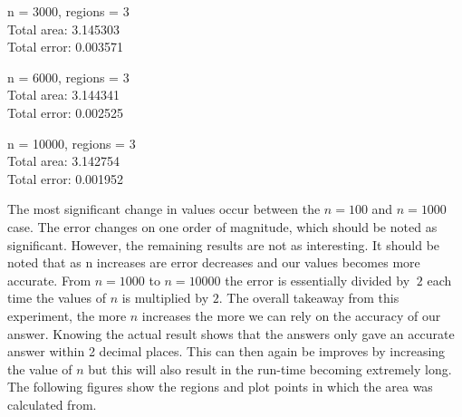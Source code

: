 \documentclass[12pt]{article}
\begin{document}
\begin{center}
n = 3000, regions = 3 \\
Total area: 3.145303 \\
Total error: 0.003571 \\
\end{center}

\begin{center}
n = 6000, regions = 3 \\
Total area: 3.144341 \\
Total error: 0.002525 \\
\end{center}

\begin{center}
n = 10000, regions = 3 \\
Total area: 3.142754 \\
Total error: 0.001952 \\
\end{center}

The most significant change in values occur between the $n = 100$ and $n = 1000$ case. The error changes on one order of magnitude, which should be noted as significant. However, the remaining results are not as interesting. It should be noted that as n increases are error decreases and our values becomes more accurate. From $n = 1000$ to $n = 10000$ the error is essentially divided by $~2$ each time the values of $n$ is multiplied by $2$. The overall takeaway from this experiment, the more $n$ increases the more we can rely on the accuracy of our answer. Knowing the actual result shows that the answers only gave an accurate answer within 2 decimal places. This can then again be improves by increasing the value of $n$ but this will also result in the run-time becoming extremely long. The following figures show the regions and plot points in which the area was calculated from.
\end{document}
